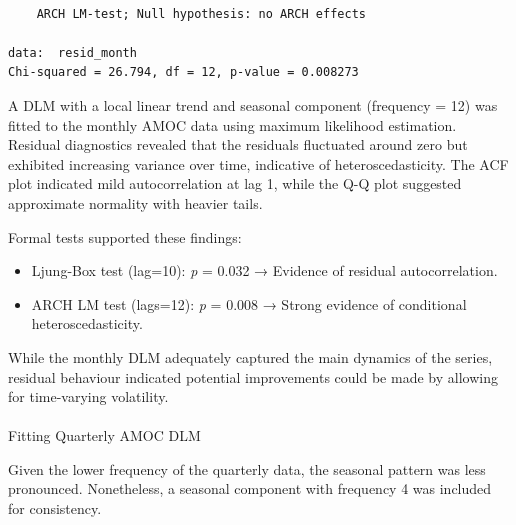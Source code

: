 \documentclass[
  11pt,
]{article}
\makeatletter
\let\oldparagraph\paragraph
\renewcommand{\paragraph}{
    \@ifstar
      \xxxParagraphStar
      \xxxParagraphNoStar
  }
\newcommand{\xxxParagraphStar}[1]{\oldparagraph*{#1}\mbox{}}
\newcommand{\xxxParagraphNoStar}[1]{\oldparagraph{#1}\mbox{}}
\makeatother
\begin{document}
\begin{verbatim}

    ARCH LM-test; Null hypothesis: no ARCH effects

data:  resid_month
Chi-squared = 26.794, df = 12, p-value = 0.008273
\end{verbatim}

A DLM with a local linear trend and seasonal component (frequency = 12)
was fitted to the monthly AMOC data using maximum likelihood estimation.
Residual diagnostics revealed that the residuals fluctuated around zero
but exhibited increasing variance over time, indicative of
heteroscedasticity. The ACF plot indicated mild autocorrelation at lag
1, while the Q-Q plot suggested approximate normality with heavier
tails.

Formal tests supported these findings:

\begin{itemize}
\item
  Ljung-Box test (lag=10): \emph{p} = 0.032 → Evidence of residual
  autocorrelation.
\item
  ARCH LM test (lags=12): \emph{p} = 0.008 → Strong evidence of
  conditional heteroscedasticity.
\end{itemize}

While the monthly DLM adequately captured the main dynamics of the
series, residual behaviour indicated potential improvements could be
made by allowing for time-varying volatility.

\paragraph{Fitting Quarterly AMOC DLM}\label{fitting-quarterly-amoc-dlm}

Given the lower frequency of the quarterly data, the seasonal pattern
was less pronounced. Nonetheless, a seasonal component with frequency 4
was included for consistency.
\end{document}
